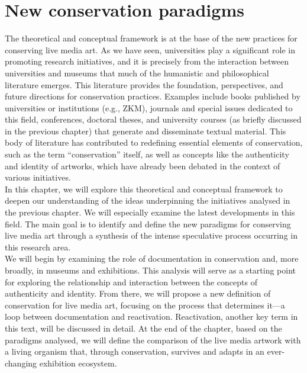 \chapter{\label{ch:2-new_conservation_paradigms}New conservation paradigms}
The theoretical and conceptual framework is at the base of the new practices for conserving live media art. As we have seen, universities play a significant role in promoting research initiatives, and it is precisely from the interaction between universities and museums that much of the humanistic and philosophical literature emerges. This literature provides the foundation, perspectives, and future directions for conservation practices. Examples include books published by universities or institutions (e.g., ZKM), journals and special issues dedicated to this field, conferences, doctoral theses, and university courses (as briefly discussed in the previous chapter) that generate and disseminate textual material. This body of literature has contributed to redefining essential elements of conservation, such as the term “conservation” itself, as well as concepts like the authenticity and identity of artworks, which have already been debated in the context of various initiatives.\\
In this chapter, we will explore this theoretical and conceptual framework to deepen our understanding of the ideas underpinning the initiatives analysed in the previous chapter. We will especially examine the latest developments in this field. The main goal is to identify and define the new paradigms for conserving live media art through a synthesis of the intense speculative process occurring in this research area.\\
We will begin by examining the role of documentation in conservation and, more broadly, in museums and exhibitions. This analysis will serve as a starting point for exploring the relationship and interaction between the concepts of authenticity and identity. From there, we will propose a new definition of conservation for live media art, focusing on the process that determines it—a loop between documentation and reactivation. Reactivation, another key term in this text, will be discussed in detail. At the end of the chapter, based on the paradigms analysed, we will define the comparison of the live media artwork with a living organism that, through conservation, survives and adapts in an ever-changing exhibition ecosystem.  

